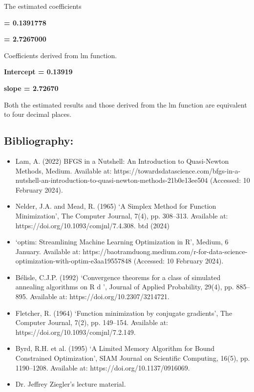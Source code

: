 \documentclass[12pt,letterpaper]{article}
\begin{document}
\vspace{2cm}

The estimated coefficients 

\textbf{= 0.1391778}

\textbf{= 2.7267000}

\vspace{1cm}

Coefficients derived from lm function.

\textbf{Intercept = 0.13919}

\textbf{slope = 2.72670}  

\vspace{1cm}

Both the estimated results and those derived from the lm function are equivalent to four decimal places. 

\vspace{2cm}
 
\subsection*{Bibliography:}

\begin{itemize}
	\item Lam, A. (2022) BFGS in a Nutshell: An Introduction to Quasi-Newton Methods, Medium. Available at: https://towardsdatascience.com/bfgs-in-a-nutshell-an-introduction-to-quasi-newton-methods-21b0e13ee504 (Accessed: 10 February 2024).
	\item Nelder, J.A. and Mead, R. (1965) ‘A Simplex Method for Function Minimization’, The Computer Journal, 7(4), pp. 308–313. Available at: https://doi.org/10.1093/comjnl/7.4.308.
	btd (2024) 
	\item ‘optim: Streamlining Machine Learning Optimization in R’, Medium, 6 January. Available at: https://baotramduong.medium.com/r-for-data-science-optimization-with-optim-e3aa19557848 (Accessed: 10 February 2024).
	\item Bélisle, C.J.P. (1992) ‘Convergence theorems for a class of simulated annealing algorithms on R  d ’, Journal of Applied Probability, 29(4), pp. 885–895. Available at: https://doi.org/10.2307/3214721.
	\item Fletcher, R. (1964) ‘Function minimization by conjugate gradients’, The Computer Journal, 7(2), pp. 149–154. Available at: https://doi.org/10.1093/comjnl/7.2.149.
	\item Byrd, R.H. et al. (1995) ‘A Limited Memory Algorithm for Bound Constrained Optimization’, SIAM Journal on Scientific Computing, 16(5), pp. 1190–1208. Available at: https://doi.org/10.1137/0916069.
	\item Dr. Jeffrey Ziegler's lecture material.
	
	
	\end{itemize}
\end{document}

